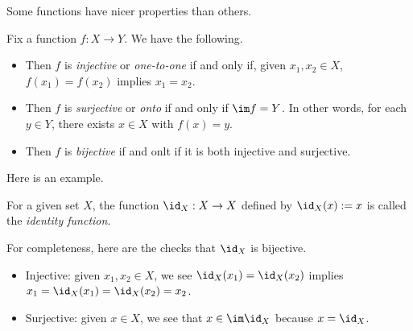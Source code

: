 Some functions have nicer properties than others.
\begin{definition}
	Fix a function $f:X\to Y$. We have the following.
	\begin{itemize}
		\item Then $f$ is \textit{injective} or \textit{one-to-one} if and only if, given $x_1,x_2\in X$, $f(x_1)=f(x_2)$ implies $x_1=x_2$.
		\item Then $f$ is \textit{surjective} or \textit{onto} if and only if $\im f=Y$. In other words, for each $y\in Y$, there exists $x\in X$ with $f(x)=y$.
		\item Then $f$ is \textit{bijective} if and onlt if it is both injective and surjective.
	\end{itemize}
\end{definition}
Here is an example.
\begin{definition}[Identity]
	For a given set $X$, the function $\id_X:X\to X$ defined by $\id_X(x):=x$ is called the \textit{identity function}.
\end{definition}
For completeness, here are the checks that $\id_X$ is bijective.
\begin{itemize}
	\item Injective: given $x_1,x_2\in X$, we see $\id_X(x_1)=\id_X(x_2)$ implies $x_1=\id_X(x_1)=\id_X(x_2)=x_2$.
	\item Surjective: given $x\in X$, we see that $x\in\im\id_X$ because $x=\id_X$.
\end{itemize}

